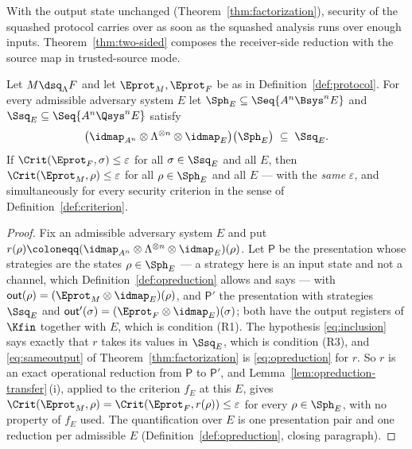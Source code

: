 
With the output state unchanged (Theorem~\ref{thm:factorization}), security
of the squashed protocol carries over as soon as the squashed analysis runs
over enough inputs. Theorem~\ref{thm:two-sided} composes the receiver-side
reduction with the source map in trusted-source mode.

\begin{theorem}\label{thm:transfer}
Let $M\dsq_{\Lambda}F$ and let $\Eprot_M,\Eprot_F$ be as in
Definition~\ref{def:protocol}. For every admissible adversary system $E$ let
$\Sph_E\subseteq\Seq{A^{n}\Bsys^{n}E}$ and
$\Ssq_E\subseteq\Seq{A^{n}\Qsys^{n}E}$ satisfy
\begin{equation}\label{eq:inclusion}
  \big(\idmap_{A^{n}}\otimes\Lambda^{\otimes n}\otimes\idmap_E\big)
  \big(\Sph_E\big)\;\subseteq\;\Ssq_E .
\end{equation}
If $\Crit(\Eprot_F,\sigma)\le\varepsilon$ for all $\sigma\in\Ssq_E$ and all
$E$, then $\Crit(\Eprot_M,\rho)\le\varepsilon$ for all $\rho\in\Sph_E$ and all
$E$ --- with the \emph{same} $\varepsilon$, and simultaneously for every
security criterion in the sense of Definition~\ref{def:criterion}.
\end{theorem}

\begin{proof}
Fix an admissible adversary system $E$ and put
$r(\rho)\coloneqq
(\idmap_{A^{n}}\otimes\Lambda^{\otimes n}\otimes\idmap_E)(\rho)$. Let
$\mathsf{P}$ be the presentation whose strategies are the states
$\rho\in\Sph_E$ --- a strategy here is an input state and not a channel, which
Definition~\ref{def:opreduction} allows and says --- with
$\mathsf{out}(\rho)=(\Eprot_M\otimes\idmap_E)(\rho)$, and $\mathsf{P}'$ the
presentation with strategies $\Ssq_E$ and
$\mathsf{out}'(\sigma)=(\Eprot_F\otimes\idmap_E)(\sigma)$; both have the output
registers of $\Kfin$ together with $E$, which is condition (R1). The
hypothesis \eqref{eq:inclusion} says exactly that $r$ takes its values in
$\Ssq_E$, which is condition (R3), and \eqref{eq:sameoutput} of
Theorem~\ref{thm:factorization} is \eqref{eq:opreduction} for $r$. So $r$ is an
exact operational reduction from $\mathsf{P}$ to $\mathsf{P}'$, and
Lemma~\ref{lem:opreduction-transfer}\,(i), applied to the criterion $f_E$ at
this $E$, gives
$\Crit(\Eprot_M,\rho)=\Crit(\Eprot_F,r(\rho))\le\varepsilon$ for every
$\rho\in\Sph_E$, with no property of $f_E$ used. The quantification over $E$ is
one presentation pair and one reduction per admissible $E$
(Definition~\ref{def:opreduction}, closing paragraph).
\end{proof}
